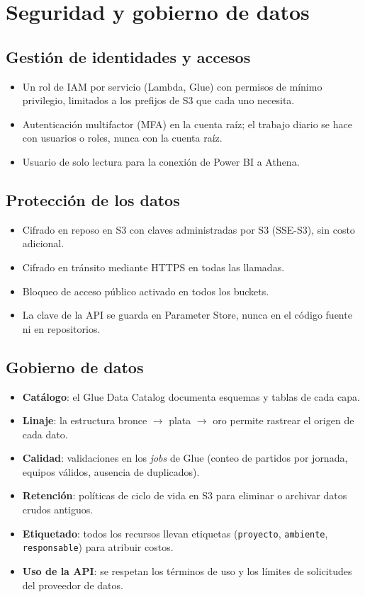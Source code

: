 \documentclass[11pt,a4paper]{article}
\begin{document}
\section{Seguridad y gobierno de datos}

\subsection{Gestión de identidades y accesos}
\begin{itemize}
  \item Un rol de IAM por servicio (Lambda, Glue) con permisos de mínimo privilegio, limitados a los prefijos de S3 que cada uno necesita.
  \item Autenticación multifactor (MFA) en la cuenta raíz; el trabajo diario se hace con usuarios o roles, nunca con la cuenta raíz.
  \item Usuario de solo lectura para la conexión de Power BI a Athena.
\end{itemize}

\subsection{Protección de los datos}
\begin{itemize}
  \item Cifrado en reposo en S3 con claves administradas por S3 (SSE-S3), sin costo adicional.
  \item Cifrado en tránsito mediante HTTPS en todas las llamadas.
  \item Bloqueo de acceso público activado en todos los buckets.
  \item La clave de la API se guarda en Parameter Store, nunca en el código fuente ni en repositorios.
\end{itemize}

\subsection{Gobierno de datos}
\begin{itemize}
  \item \textbf{Catálogo}: el Glue Data Catalog documenta esquemas y tablas de cada capa.
  \item \textbf{Linaje}: la estructura bronce $\rightarrow$ plata $\rightarrow$ oro permite rastrear el origen de cada dato.
  \item \textbf{Calidad}: validaciones en los \textit{jobs} de Glue (conteo de partidos por jornada, equipos válidos, ausencia de duplicados).
  \item \textbf{Retención}: políticas de ciclo de vida en S3 para eliminar o archivar datos crudos antiguos.
  \item \textbf{Etiquetado}: todos los recursos llevan etiquetas (\texttt{proyecto}, \texttt{ambiente}, \texttt{responsable}) para atribuir costos.
  \item \textbf{Uso de la API}: se respetan los términos de uso y los límites de solicitudes del proveedor de datos.
\end{itemize}
\end{document}
